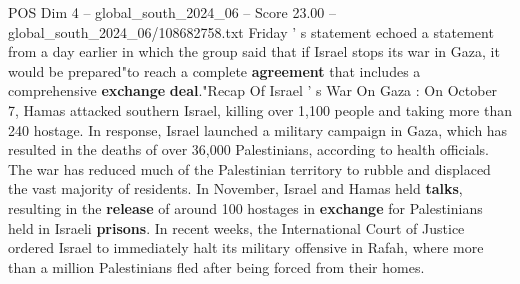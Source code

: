 \begin{textsample}{POS Dim 4 – global\_south\_2024\_06 – Score 23.00 – global\_south\_2024\_06/108682758.txt}
Friday ' s statement echoed a statement from a day earlier in which the group said that if Israel stops its war in Gaza, it would be prepared"to reach a complete \textbf{agreement} that includes a comprehensive \textbf{exchange} \textbf{deal}."Recap Of Israel ' s War On Gaza : On October 7, Hamas attacked southern Israel, killing over 1,100 people and taking more than 240 hostage.
In response, Israel launched a military campaign in Gaza, which has resulted in the deaths of over 36,000 Palestinians, according to health officials.
The war has reduced much of the Palestinian territory to rubble and displaced the vast majority of residents.
In November, Israel and Hamas held \textbf{talks}, resulting in the \textbf{release} of around 100 hostages in \textbf{exchange} for Palestinians held in Israeli \textbf{prisons}.
In recent weeks, the International Court of Justice ordered Israel to immediately halt its military offensive in Rafah, where more than a million Palestinians fled after being forced from their homes.

\end{textsample}
